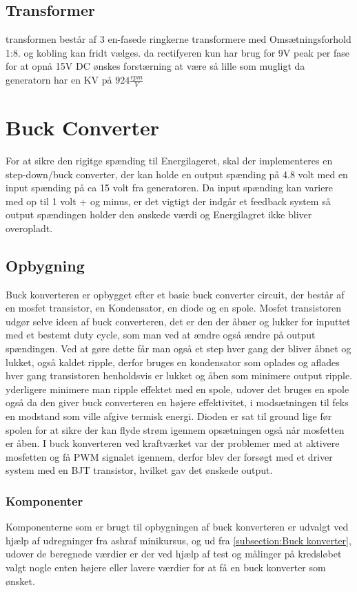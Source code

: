 \documentclass[../main.tex]{subfiles}
\begin{document}
\subsection{Transformer}
transformen består af 3 en-fasede ringkerne transformere med Omsætningsforhold 1:8. og kobling kan fridt vælges. da rectifyeren kun har brug for 9V peak per fase for at opnå 15V DC ønskes forstærning at være så lille som mugligt da generatorn har en KV på $ 924 \frac{rpm}{V}$  




\section{Buck Converter}
For at sikre den rigitge spænding til Energilageret, skal der implementeres en step-down/buck converter, der kan holde en output spænding på 4.8 volt med en input spænding på ca 15 volt fra generatoren. Da input spænding kan variere med op til 1 volt + og minus, er det vigtigt der indgår et feedback system så output spændingen holder den ønskede værdi og Energilagret ikke bliver overopladt.

\subsection{Opbygning}
Buck konverteren er opbygget efter et basic buck converter circuit, der består af en mosfet transistor, en Kondensator, en diode og en spole. Mosfet transistoren udgør selve ideen af buck converteren, det er den der åbner og lukker for inputtet med et bestemt duty cycle, som man ved at ændre også ændre på output spændingen. Ved at gøre dette får man også et step hver gang der bliver åbnet og lukket, også kaldet ripple, derfor bruges en kondensator som oplades og aflades hver gang transistoren henholdsvis er lukket og åben som minimere output ripple. yderligere minimere man ripple effektet med en spole, udover det bruges en spole også da den giver buck converteren en højere effektivitet, i modsætningen til feks en modstand som ville afgive termisk energi. Dioden er sat til ground lige før spolen for at sikre der kan flyde strøm igennem opsætningen også når mosfetten er åben. 
I buck konverteren ved kraftværket var der problemer med at aktivere mosfetten og få PWM signalet igennem, derfor blev der forsøgt med et driver system med en BJT transistor, hvilket gav det ønskede output. 

\subsubsection{Komponenter}
Komponenterne som er brugt til opbygningen af buck konverteren er udvalgt ved hjælp af udregninger fra ashraf minikursus, og ud fra \ref{subsection:Buck konverter}, udover de beregnede værdier er der ved hjælp af test og målinger på kredsløbet valgt nogle enten højere eller lavere værdier for at få en buck konverter som ønsket.
\end{document}
